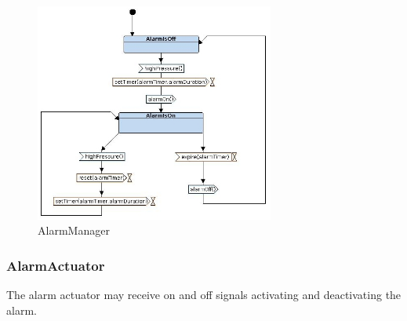 \documentclass[12pt]{article}
\begin{document}
\begin{figure}[h!]
\centering
\includegraphics[width=0.7\textwidth]{images/alarmmanager.jpg}
\caption{AlarmManager}
\label{fig:alarmmanager}
\end{figure}

\subsubsection{AlarmActuator}
The alarm actuator may receive on and off signals activating and deactivating the alarm.
\end{document}
